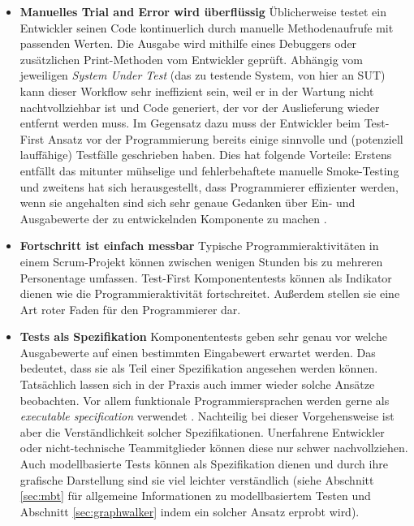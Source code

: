 \begin{itemize}
\item \textbf{Manuelles Trial and Error wird überflüssig} Üblicherweise testet ein Entwickler seinen Code kontinuerlich durch manuelle Methodenaufrufe mit passenden Werten. Die Ausgabe wird mithilfe eines Debuggers oder zusätzlichen Print-Methoden vom Entwickler geprüft. Abhängig vom jeweiligen \textit{System Under Test} (das zu testende System, von hier an \gls{SUT}) kann dieser Workflow sehr ineffizient sein, weil er in der Wartung nicht nachtvollziehbar ist und Code generiert, der vor der Auslieferung wieder entfernt werden muss. Im Gegensatz dazu muss der Entwickler beim Test-First Ansatz vor der Programmierung bereits einige sinnvolle und (potenziell lauffähige) Testfälle geschrieben haben. Dies hat folgende Vorteile: Erstens entfällt das mitunter mühselige und fehlerbehaftete manuelle Smoke-Testing und zweitens hat sich herausgestellt, dass Programmierer effizienter werden, wenn sie angehalten sind sich sehr genaue Gedanken über Ein- und Ausgabewerte der zu entwickelnden Komponente zu machen \cite{erdogmus_effectiveness_2005}.
\item \textbf{Fortschritt ist einfach messbar} Typische Programmieraktivitäten in einem Scrum-Projekt können zwischen wenigen Stunden bis zu mehreren Personentage umfassen. Test-First Komponententests können als Indikator dienen wie die Programmieraktivität fortschreitet. Außerdem stellen sie eine Art roter Faden für den Programmierer dar.
\item \textbf{Tests als Spezifikation} Komponententests geben sehr genau vor welche Ausgabewerte auf einen bestimmten Eingabewert erwartet werden. Das bedeutet, dass sie als Teil einer Spezifikation angesehen werden können. Tatsächlich lassen sich in der Praxis auch immer wieder solche Ansätze beobachten. Vor allem funktionale Programmiersprachen werden gerne als \textit{executable specification} verwendet \cite{klein_sel4:_2010}. Nachteilig bei dieser Vorgehensweise ist aber die Verständlichkeit solcher Spezifikationen. Unerfahrene Entwickler oder nicht-technische Teammitglieder können diese nur schwer nachvollziehen. Auch modellbasierte Tests können als Spezifikation dienen und durch ihre grafische Darstellung sind sie viel leichter verständlich (siehe Abschnitt \ref{sec:mbt} für allgemeine Informationen zu modellbasiertem Testen und Abschnitt \ref{sec:graphwalker} indem ein solcher Ansatz erprobt wird).
\end{itemize}


